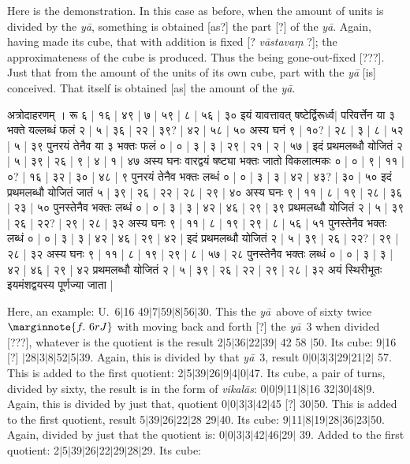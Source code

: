 \documentclass[12pt]{book}
\let\*=\d
\def\ya{\textit{y\=a}}
\def\vikalas{\textit{vi\-ka\-l\=as}}
\def\danda{$|$}
\begin{document}
Here is the demonstration. In this case as before, when the amount of units is divided by the \ya, 
something is obtained [as?] the part [?] of the \ya. Again, having made its cube, that with addition
is fixed [? \textit{v\=astava\*m} ?]; the approximateness of the cube is produced. Thus the being
gone-out-fixed [???].  Just that from the amount of the units of its own cube, part with the \ya 
[is] conceived. That itself is obtained [as] the amount of the \ya. 

\newpage

{\s अत्रोदाहरणम् । रू ६ | १६ | ४९ | ७ | ५९ | ८ | ५६ | ३० इयं यावत्तावत् षष्टेर्द्विरूर्ध्व$|$
परिवर्त्तेन या ३ भक्ते यल्लब्धं फलं २ | ५ | ३६ | २२ | ३९? | ४२ | ५८ | ५० अस्य घनं ९ | १०? | २८ | ३ | ८ | ५२ | ५ | ३९
पुनरयं तेनैव या ३ भक्तः फलं ० | ० | ३ | ३ | २९ | २१ | २ | ५७ |
इदं प्रथमलब्धौ योजितं २ | ५ | ३९ | २६ | ९ | ४ | १ | ४७ अस्य घनः वारद्वयं षष्ट्या भक्तः जातो विकलात्मकः ० | ० | ९ | ११ | ०? | १६ | ३२ | ३० | ४८ | ९ पुनरयं तेनैव भक्तः लब्धं ० | ० | ३ | ३ | ४२ | ४३? | ३० | ५०
इदं प्रथमलब्धौ योजितं जातं ५ | ३९ | २६ | २२ | २८ | २९ | ४० अस्य घनः ९ | ११ | ८ | १९ | २८ | ३६ | २३ | ५० पुनस्तेनैव भक्तः लब्धं ० | ० | ३ | ३ | ४२ | ४६ | २९ | ३९ प्रथमलब्धौ योजितं २ | ५ | ३९ | २६ | २२? | २९ | २८ | ३२
अस्य घनः ९ | ११ | ८ | १९ | २९ | ८ | ५६ | ५१ पुनस्तेनैव भक्तः लब्धं ० | ० | ३ | ३ | ४२ | ४६ | २९ | ४२ | इदं प्रथमलब्धौ योजितं २ | ५ | ३९ | २६ | २२? | २९ | २८ | ३२ अस्य घनः ९ | ११ | ८ | १९ | २९ | ८ | ५७ | २८
पुनस्तेनैव भक्तः लब्धं ० | ० | ३ | ३ | ४२ | ४६ | २९ | ४२ प्रथमलब्धौ योजितं २ | ५ | ३९ | २६ | २२ | २९ | २८ | ३२ अयं स्थिरीभूतः इयमंशद्वयस्य पूर्णज्या जाता |} 

\newpage

Here, an example: U.\ 6\danda 16  49\danda 7\danda 59\danda 8\danda 56\danda 30. 
This the \ya\ above of sixty twice
$\marginnote{f.~6r J} $
with moving back and forth [?] the \ya\ 3 when divided [???],
whatever is the quotient is the result 2\danda 5\danda 36\danda 22\danda 39\danda
42 58 \danda 50. Its cube: 9\danda 16 [?] \danda 28\danda 3\danda 8\danda 52\danda 5\danda 39.
Again, this is divided by that \ya\ 3, result 0\danda 0\danda 3\danda 3\danda 29\danda 21\danda 2\danda 
57. This is added to the first quotient: 2\danda 5\danda 39\danda 26\danda 9\danda 4\danda 0\danda 47.
Its cube, a pair of turns, divided by sixty, the result is in the form of \vikalas: 
0\danda 0\danda 9\danda 11\danda 8\danda 16 32\danda 30\danda 48\danda 9.
Again, this is divided by just that, quotient 0\danda 0\danda 3\danda 3\danda 42\danda 45 [?]
30\danda 50. This is added to the first quotient, result 5\danda 39\danda 26\danda 22\danda 28
29\danda 40. Its cube: 9\danda 11\danda 8\danda 19\danda 28\danda 36\danda 23\danda 50.
Again, divided by just that the quotient is: 0\danda 0\danda 3\danda 3\danda 42\danda 46\danda 29\danda
39. Added to the first quotient: 2\danda 5\danda 39\danda 26\danda 22\danda 29\danda 28\danda 29. 
Its cube: 
\end{document}
